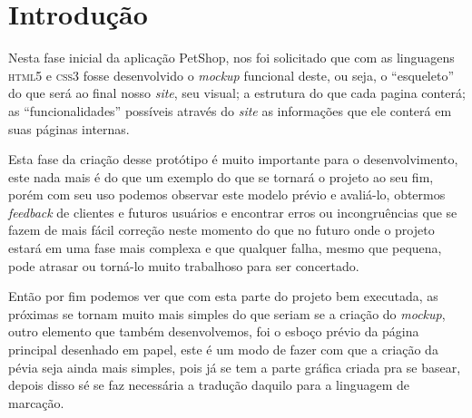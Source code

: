 \chapter{Introdução}

Nesta fase inicial da aplicação PetShop, nos foi solicitado que com as
linguagens \textsc{html5} e \textsc{css3} fosse desenvolvido o \emph{mockup}
funcional deste, ou seja, o “esqueleto” do que será ao final nosso \emph{site},
seu visual; a estrutura do que cada pagina conterá; as “funcionalidades”
possíveis através do \emph{site} as informações que ele conterá em suas páginas
internas.

Esta fase da criação desse protótipo é muito importante para o desenvolvimento,
este nada mais é do que um exemplo do que se tornará o projeto ao seu fim,
porém com seu uso podemos observar este modelo prévio e avaliá-lo, obtermos
\emph{feedback} de clientes e futuros usuários e encontrar erros ou incongruências
que se fazem de mais fácil correção neste momento do que no futuro onde o
projeto estará em uma fase mais complexa e que qualquer falha, mesmo que
pequena, pode atrasar ou torná-lo muito trabalhoso para ser concertado.

Então por fim podemos ver que com esta parte do projeto bem executada, as
próximas se tornam muito mais simples do que seriam se a criação do \emph{mockup},
outro elemento que também desenvolvemos, foi o esboço prévio da página
principal desenhado em papel, este é um modo de fazer com que a criação da
pévia seja ainda mais simples, pois já se tem a parte gráfica criada pra se
basear, depois disso sé se faz necessária a tradução daquilo para a linguagem
de marcação.
